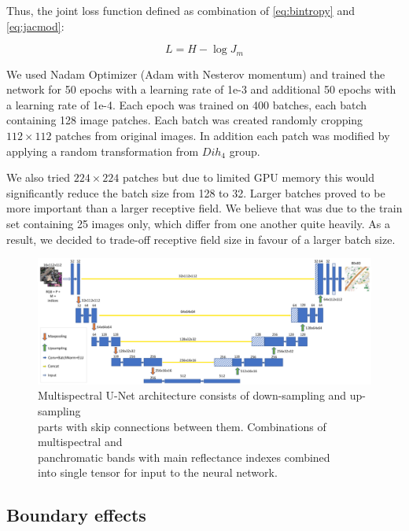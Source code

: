 \documentclass[10pt,twocolumn,letterpaper]{article}
\begin{document}
Thus, the joint loss function defined as combination of \ref{eq:bintropy} and \ref{eq:jacmod}:

\begin{equation}
L = H - \log J_{m}
\end{equation}

We used Nadam Optimizer (Adam with Nesterov momentum) \cite{nadam} and trained the network for 50 epochs with a learning rate of 1e-3 and additional 50 epochs with a learning rate of 1e-4. Each epoch was trained on 400 batches, each batch containing 128 image patches. Each batch was created randomly cropping $112 \times 112$ patches from original images. In addition each patch was modified by applying a random transformation from $Dih_4$ group.

We also tried $224 \times 224$ patches but due to limited GPU memory this would significantly reduce the batch size from 128 to 32. Larger batches proved to be more important than a larger receptive field. We believe that was due to the train set containing 25 images only, which differ from one another quite heavily. As a result, we decided to trade-off receptive field size in favour of a larger batch size.

\begin{figure}[th]
	\centering
	\includegraphics[scale=0.28]{unet}
	\captionsetup{justification=centering}
	\caption{Multispectral U-Net architecture consists of down-sampling and up-sampling \\ parts with skip connections between them.  Combinations of multispectral and \\ panchromatic bands with main reflectance indexes combined \\ into single tensor for input to the neural network. }
	\label{fig:unet}
\end{figure}

\subsection{Boundary effects}
\end{document}
